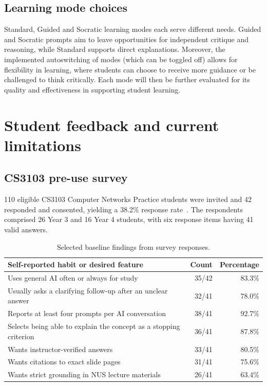\section{Learning mode choices}
Standard, Guided and Socratic learning modes each serve different needs. Guided and Socratic prompts aim to leave opportunities for independent critique and reasoning, while Standard supports direct explanations. Moreover, the implemented autoswitching of modes (which can be toggled off) allows for flexibility in learning, where students can choose to receive more guidance or be challenged to think critically. Each mode will then be further evaluated for its quality and effectiveness in supporting student learning.

\chapter{Student feedback and current limitations}

\section{CS3103 pre-use survey}
110 eligible CS3103 Computer Networks Practice students were invited and 42 responded and consented, yielding a 38.2\% response rate~\parencite{cragpaper}. The respondents comprised 26 Year 3 and 16 Year 4 students, with six response items having 41 valid answers.

\begin{table}[htbp]
\centering\small
\caption{Selected baseline findings from survey responses.}
\label{tab:baseline}
\begin{tabularx}{\textwidth}{@{}Yrr@{}}
\toprule
Self-reported habit or desired feature & Count & Percentage\\
\midrule
Uses general AI often or always for study & 35/42 & 83.3\%\\
Usually asks a clarifying follow-up after an unclear answer & 32/41 & 78.0\%\\
Reports at least four prompts per AI conversation & 38/41 & 92.7\%\\
Selects being able to explain the concept as a stopping criterion & 36/41 & 87.8\%\\
Wants instructor-verified answers & 33/41 & 80.5\%\\
Wants citations to exact slide pages & 31/41 & 75.6\%\\
Wants strict grounding in NUS lecture materials & 26/41 & 63.4\%\\
\bottomrule
\end{tabularx}
\end{table}

